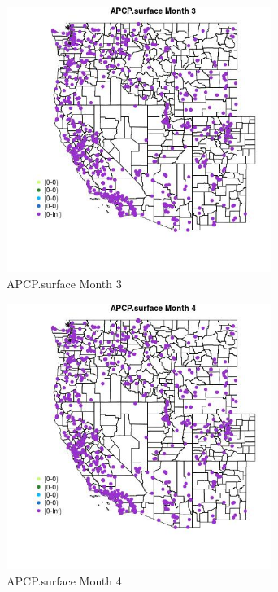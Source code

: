 \begin{figure} 
\centering  
\includegraphics[width=0.77\textwidth]{Code_Outputs/Report_ML_input_PM25_Step4_part_f_de_duplicated_aveswNAs_MapObsMo3APCPsurface.jpg} 
\caption{\label{fig:Report_ML_input_PM25_Step4_part_f_de_duplicated_aveswNAsMapObsMo3APCPsurface}APCP.surface Month 3} 
\end{figure} 
 

\begin{figure} 
\centering  
\includegraphics[width=0.77\textwidth]{Code_Outputs/Report_ML_input_PM25_Step4_part_f_de_duplicated_aveswNAs_MapObsMo4APCPsurface.jpg} 
\caption{\label{fig:Report_ML_input_PM25_Step4_part_f_de_duplicated_aveswNAsMapObsMo4APCPsurface}APCP.surface Month 4} 
\end{figure} 
 

